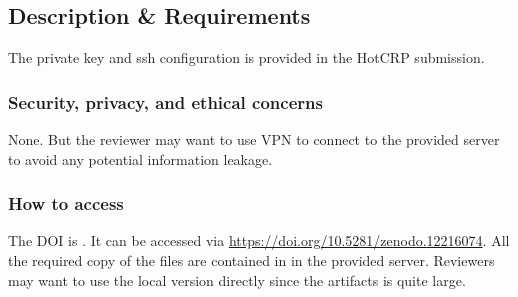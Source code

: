 \subsection{Description \& Requirements}

The private key and ssh configuration is provided in the HotCRP submission.

\subsubsection{Security, privacy, and ethical concerns}
None. But the reviewer may want to use VPN to connect to the provided server to avoid any potential information leakage.

\subsubsection{How to access}
The DOI is .
It can be accessed via \url{https://doi.org/10.5281/zenodo.12216074}.
All the required copy of the files are contained in  in the provided server.
Reviewers may want to use the local version directly since the artifacts is quite large.


